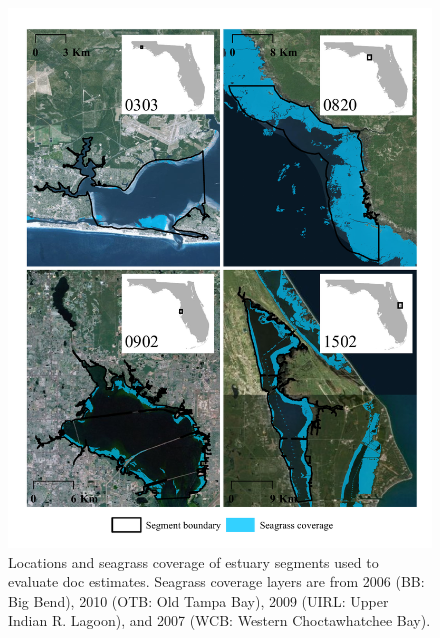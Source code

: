 \documentclass[letterpaper,12pt,oneside]{article}\usepackage[]{graphicx}\usepackage[]{color}
\begin{document}
\begin{figure}
\centerline{\includegraphics[width = \textwidth]{figs/seg_all.pdf}}
\caption{Locations and seagrass coverage of estuary segments used to evaluate \acl{doc} estimates.  Seagrass coverage layers are from 2006 (BB: Big Bend), 2010 (OTB: Old Tampa Bay), 2009 (UIRL: Upper Indian R. Lagoon), and 2007 (WCB: Western Choctawhatchee Bay).}
\label{fig:seg_all}
\end{figure}

\end{document}
